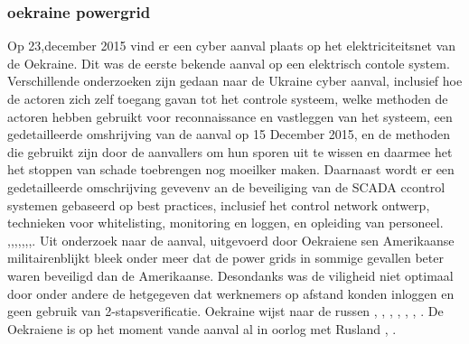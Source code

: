 \documentclass{article}
\begin{document}
	\subsubsection{oekraine powergrid}
	\newline \indent 
	Op 23,december 2015  vind er een cyber aanval plaats op het elektriciteitsnet van de Oekraine. Dit was de eerste bekende aanval op een elektrisch contole  system.  Verschillende onderzoeken zijn gedaan naar de Ukraine cyber aanval,
	inclusief hoe de actoren zich zelf toegang gavan tot het controle systeem, welke methoden de actoren hebben gebruikt voor reconnaissance en vastleggen van het systeem, een gedetailleerde omshrijving van de aanval op 15 December 2015, en de methoden die gebruikt zijn door de aanvallers om hun sporen uit te wissen en daarmee het het stoppen van schade toebrengen  nog moeilker maken. Daarnaast wordt er  een gedetailleerde omschrijving gevevenv an de beveiliging van de SCADA ccontrol systemen gebaseerd op best practices, inclusief het control network ontwerp, technieken voor whitelisting, monitoring en loggen, en  opleiding van personeel.
	\cite{Whitehead2017ukrainepoweroutage}
	\cite{noauthor_2022-nm}
	\cite{zetter2016GridHack}
	\cite{owens21032017ukrainemitigationstrategies}
	\cite{cerulus2019FrontlineRussiaAttack}
	\cite{grammatikis2019AttackIEC6087505104}
	\cite{usgovC2M2}
	\cite{zetter2016GridHack},\cite{boozallen2016lightwentout},\cite{finklejan2016UsBlamesRussianSandworm},\cite{desarnaud2017cyberattacks},\cite{caseli04112016intrusiondetectioncontrolsystem},\cite{rochascadatesting},\cite{hidajat2016ScadaSimulator},\cite{zetter2017moreDangerousMalware}.
	Uit onderzoek\cite{zetter2016GridHack} naar de aanval,  uitgevoerd door Oekraiene sen Amerikaanse militairenblijkt  bleek onder meer dat de power grids in sommige gevallen beter waren beveiligd dan de Amerikaanse. Desondanks was de viligheid niet optimaal door onder andere de  hetgegeven dat werknemers op afstand konden inloggen en geen gebruik van 2-stapsverificatie.
	Oekraine wijst naar de russen \cite{zetter2016GridHack}, 
	\cite{greenberg2017Cyberwartestlab},
	\cite{boozallen2016lightwentout},
	\cite{finkle08012016russiansandwormhackers},
	\cite{zinets15022017ukrainechargesrussia},
	\cite{mcelfresh2016cyberattackhowandwhy},
	\cite{parkwalstorm11102017russiagridattack}.
	De  Oekraiene is op het moment vande aanval al in oorlog met Rusland
	\cite{drago2017CrashOverride},
	\cite{slowik2019ReassasUkraine2016Attack}.
\end{document}
